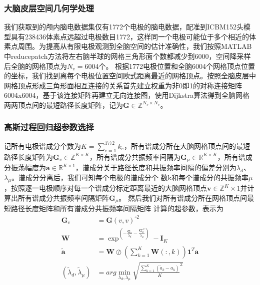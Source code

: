 \subsubsection{大脑皮层空间几何学处理}
我们获取到的颅内脑电数据集仅有1772个电极的脑电数据，配准到ICBM152头模型具有238436体素点远超过电极数目1772，这样同一个电极可能位于多个相近的体素点周围。为提高从有限电极观测到全脑空间的估计准确性，我们按照MATLAB中reducepatch方法将左右脑半球的网格三角形面个数都减少到6000，空间降采样后全脑的网格顶点为$N_v=6004$个。 根据1772电极位置和全脑6004个网格顶点位置的坐标，我们找到离每个电极位置空间欧式距离最近的网格顶点。按照全脑皮层中网格顶点形成三角形面相互连接的关系首先建立权重为非0即1的对称连接矩阵6004x6004，基于该连接矩阵再建立无向连接图，使用Dijkstra算法得到全脑网格两两顶点间的最短路径长度矩阵，记为$\mathbf{G}\in{\mathbb{Z}^{N_v\times{N_v}}}$。

\subsubsection{高斯过程回归超参数选择}
记所有电极谱成分个数为$K=\sum_{e=1}^{1772}k_e$，所有谱成分所在大脑网格顶点间的最短路径长度矩阵为$\mathbf{G}_v\in{\mathbb{Z}^{K\times{K}}}$，所有谱成分共振频率间隔为$\mathbf{G}_\mu\in{\mathbb{R}^{K\times{K}}}$，所有谱成分振荡幅度为$\mathbf{a}\in{\mathbb{R}^{K\times1}}$，谱成分关于路径长度和共振频率间隔的偏差分别为$\lambda_d$、$\lambda_\mu$。谱成分分离后，我们可知每个电极的谱成分个
数k和每个谱成分的共振频率$\mu$，按照逐一电极顺序对每一个谱成分标定距离最近的大脑网格顶点$\mathbf{v}\in{\mathbb{Z}^{K}\times1}$并计算出所有谱成分共振频率间隔矩阵$\mathbf{G}_\mu$。 然后我们对所有谱成分所在网格顶点间最短路径长度矩阵和所有谱成分共振频率间隔矩阵
计算的超参数，表示为
\begin{equation}\label{eq7.15}
\begin{aligned}
\mathbf{G}_v& = \mathbf{G}(v,v)^{\circ2}\\
\mathbf{W}& =\exp^{(-\frac{\mathbf{G}_v}{\lambda_d}-\frac{\mathbf{G}_\mu^{\circ2}}{\lambda_\mu})}-\mathbf{I}_K\\
\tilde{\mathbf{a}}& =\mathbf{W}\oslash{(\sum_{k=1}^K\mathbf{W}(:,k))\mathbf{1}^T}\mathbf{a}\\
(\tilde{\lambda}_d,\tilde{\lambda}_\mu)& =arg\min_{\lambda_d,\lambda_\mu}\sqrt{{\frac{\sum_{k=1}^{K}(\tilde{a}_k-a_k)}{K}}^2}
\end{aligned}
\end{equation}

